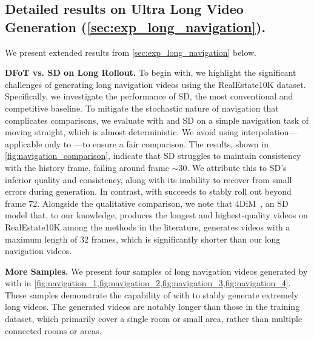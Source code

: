 \subsection{Detailed results on Ultra Long Video Generation (\cref{sec:exp_long_navigation}).}
\label{app:exp_results_navigation}

We present extended results from \cref{sec:exp_long_navigation} below.

\textbf{DFoT vs. SD on Long Rollout.} To begin with, we highlight the significant challenges of generating long navigation videos using the RealEstate10K dataset. Specifically, we investigate the performance of SD, the most conventional and competitive baseline. To mitigate the stochastic nature of navigation that complicates comparisons, we evaluate \mtd with \HG and SD on a simple navigation task of moving straight, which is almost deterministic. We avoid using interpolation—applicable only to \mtd—to ensure a fair comparison. The results, shown in \cref{fig:navigation_comparison}, indicate that SD struggles to maintain consistency with the history frame, failing around frame $\sim$30. We attribute this to SD's inferior quality and consistency, along with its inability to recover from small errors during generation. In contrast, \mtd with \HG succeeds to stably roll out beyond frame 72. Alongside the qualitative comparison, we note that 4DiM~\cite{watson2024controlling}, an SD model that, to our knowledge, produces the longest and highest-quality videos on RealEstate10K among the methods in the literature, generates videos with a maximum length of 32 frames, which is significantly shorter than our long navigation videos.

\textbf{More Samples.} We present four samples of long navigation videos generated by \mtd with \HG in \cref{fig:navigation_1,fig:navigation_2,fig:navigation_3,fig:navigation_4}. These samples demonstrate the capability of \mtd with \HG to stably generate extremely long videos. The generated videos are notably longer than those in the training dataset, which primarily cover a single room or small area, rather than multiple connected rooms or areas.

